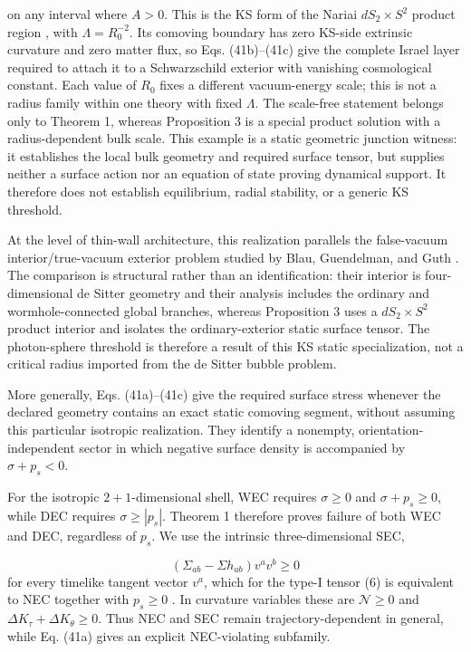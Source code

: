 \documentclass[pdflatex,sn-mathphys-num]{sn-jnl}
\begin{document}
on any interval where \(A>0\). This is the KS form of the Nariai \(dS_2\times S^2\) product region \cite{ref12}, with \(\Lambda=R_0^{-2}\). Its comoving boundary has zero KS-side extrinsic curvature and zero matter flux, so Eqs. (41b)--(41c) give the complete Israel layer required to attach it to a Schwarzschild exterior with vanishing cosmological constant. Each value of \(R_0\) fixes a different vacuum-energy scale; this is not a radius family within one theory with fixed \(\Lambda\). The scale-free statement belongs only to Theorem 1, whereas Proposition 3 is a special product solution with a radius-dependent bulk scale. This example is a static geometric junction witness: it establishes the local bulk geometry and required surface tensor, but supplies neither a surface action nor an equation of state proving dynamical support. It therefore does not establish equilibrium, radial stability, or a generic KS threshold.


At the level of thin-wall architecture, this realization parallels the false-vacuum interior/true-vacuum exterior problem studied by Blau, Guendelman, and Guth \cite{ref4}. The comparison is structural rather than an identification: their interior is four-dimensional de Sitter geometry and their analysis includes the ordinary and wormhole-connected global branches, whereas Proposition 3 uses a \(dS_2\times S^2\) product interior and isolates the ordinary-exterior static surface tensor. The photon-sphere threshold is therefore a result of this KS static specialization, not a critical radius imported from the de Sitter bubble problem.


More generally, Eqs. (41a)--(41c) give the required surface stress whenever the declared geometry contains an exact static comoving segment, without assuming this particular isotropic realization. They identify a nonempty, orientation-independent sector in which negative surface density is accompanied by \(\sigma+p_s<0\).


For the isotropic \(2+1\)-dimensional shell, WEC requires \(\sigma\ge0\) and \(\sigma+p_s\ge0\), while DEC requires \(\sigma\ge|p_s|\). Theorem 1 therefore proves failure of both WEC and DEC, regardless of \(p_s\). We use the intrinsic three-dimensional SEC,

\[
\left(\Sigma_{ab}-\Sigma h_{ab}\right)v^av^b\ge0
\]
for every timelike tangent vector \(v^a\), which for the type-I tensor (6) is equivalent to NEC together with \(p_s\ge0\) \cite[Proposition 3]{ref20}. In curvature variables these are \(\mathcal N\ge0\) and \(\Delta K_\tau+\Delta K_\theta\ge0\). Thus NEC and SEC remain trajectory-dependent in general, while Eq. (41a) gives an explicit NEC-violating subfamily.
\end{document}
